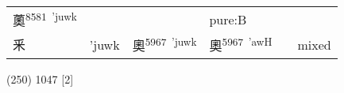 \documentclass[14pt,a4paper]{scrartcl}
\begin{document}
\begin{longtable}[c]{@{}llllll@{}}
\begin{minipage}[t]{0.14\columnwidth}\raggedright\strut
薁\textsuperscript{8581~'juwk}
\strut\end{minipage} &
\begin{minipage}[t]{0.14\columnwidth}\raggedright\strut
\strut\end{minipage} &
\begin{minipage}[t]{0.14\columnwidth}\raggedright\strut
\strut\end{minipage} &
\begin{minipage}[t]{0.14\columnwidth}\raggedright\strut
pure:B
\strut\end{minipage}\tabularnewline
\begin{minipage}[t]{0.14\columnwidth}\raggedright\strut
釆
\strut\end{minipage} &
\begin{minipage}[t]{0.14\columnwidth}\raggedright\strut
'juwk
\strut\end{minipage} &
\begin{minipage}[t]{0.14\columnwidth}\raggedright\strut
奧\textsuperscript{5967~'juwk}
\strut\end{minipage} &
\begin{minipage}[t]{0.14\columnwidth}\raggedright\strut
奧\textsuperscript{5967~'awH}
\strut\end{minipage} &
\begin{minipage}[t]{0.14\columnwidth}\raggedright\strut
\strut\end{minipage} &
\begin{minipage}[t]{0.14\columnwidth}\raggedright\strut
mixed
\strut\end{minipage}\tabularnewline
\bottomrule
\end{longtable}

(250) 1047 {[}2{]}
\end{document}
